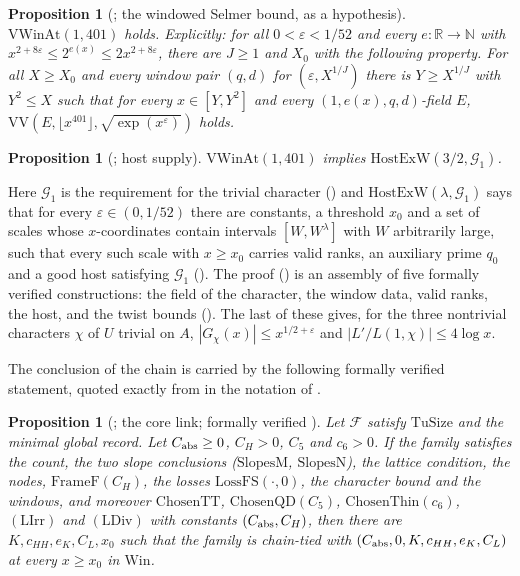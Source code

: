 \documentclass[10pt]{amsart}
\newtheorem{proposition}[theorem]{Proposition}
\theoremstyle{definition}
\theoremstyle{remark}
\newcommand{\R}{\mathbb R}
\newcommand{\N}{\mathbb N}
\begin{document}
\begin{proposition}[{\cite[Proposition~\ref{A-i4:hyp-selmer}]{Annex}}; the windowed Selmer bound, as a hypothesis]\label{inp:prop-hypSel}
$\mathrm{VWinAt}(1,401)$ holds. Explicitly: for all
$0<\varepsilon<1/52$ and every $e:\R\to\N$ with
$x^{2+8\varepsilon}\le2^{e(x)}\le2x^{2+8\varepsilon}$, there are $J\ge1$
and $X_0$ with the following property. For all $X\ge X_0$ and every window
pair $(q,d)$ for $(\varepsilon,X^{1/J})$ there is $Y\ge X^{1/J}$ with
$Y^2\le X$ such that for every $x\in[Y,Y^2]$ and every $(1,e(x),q,d)$-field
$E$, $\mathrm{VV}(E,\lfloor x^{401}\rfloor,\sqrt{\exp(x^\varepsilon)})$
holds.
\end{proposition}

\begin{proposition}[{\cite[Proposition~\ref{A-i4:prop-supply}]{Annex}}; host supply]\label{inp:prop-supply}
$\mathrm{VWinAt}(1,401)$ implies $\mathrm{HostExW}(3/2,\mathcal G_1)$.
\end{proposition}

\noindent Here $\mathcal G_1$ is the requirement for the trivial character
(\cite[Definition~\ref{A-i4:def-G1}]{Annex}) and $\mathrm{HostExW}(\lambda,\mathcal G_1)$
says that for every $\varepsilon\in(0,1/52)$ there are constants, a
threshold $x_0$ and a set of scales whose $x$-coordinates contain intervals
$[W,W^\lambda]$ with $W$ arbitrarily large, such that every such scale with
$x\ge x_0$ carries valid ranks, an auxiliary prime $q_0$ and a good host
satisfying $\mathcal G_1$ (\cite[Definition~\ref{A-i4:def-G1}]{Annex}). The proof (\cite[\S\ref{A-i4:ssec-proof-supply}]{Annex}) is
an assembly of five formally verified constructions: the field of the
character, the window data, valid ranks, the host, and the twist bounds
(\cite[Propositions~\ref{A-i4:Sprop-field}--\ref{A-i4:Sprop-tw}]{Annex}). The
last of these gives, for the three nontrivial characters $\chi$ of $U$
trivial on $A$, $|G_\chi(x)|\le x^{1/2+\varepsilon}$ and
$|L'/L(1,\chi)|\le4\log x$.

The conclusion of the chain is carried by the following formally verified
statement, quoted exactly from \cite[Proposition~\ref{A-i4:Lprop-fam}(c)]{Annex}
in the notation of \cite[\S\ref{A-i4:ssec-links}]{Annex}.

\begin{proposition}[{\cite[Proposition~\ref{A-i4:Lprop-fam}(c)]{Annex}}; the core link; formally verified \cite{CharacterFamily}]\label{inp:prop-corelink}
Let $\mathcal F$ satisfy $\mathrm{TuSize}$ and the minimal global record.
Let $C_{\rm abs}\ge0$, $C_H>0$, $C_5$ and
$c_6>0$. If the family satisfies the count, the two slope conclusions
\textup{(}$\mathrm{SlopesM}$, $\mathrm{SlopesN}$\textup{)}, the lattice condition, the
nodes, $\mathrm{FrameF}(C_H)$, the losses $\mathrm{LossFS}(\cdot,0)$, the
character bound and the windows, and moreover
$\mathrm{ChosenTT}$, $\mathrm{ChosenQD}(C_5)$, $\mathrm{ChosenThin}(c_6)$,
$(\mathrm{LIrr})$ and $(\mathrm{LDiv})$ with constants $(C_{\rm abs},C_H)$,
then there are $K,c_{HH},e_K,C_L,x_0$ such that the family is chain-tied
with $(C_{\rm abs},0,K,c_{HH},e_K,C_L)$ at every $x\ge x_0$ in
$\mathrm{Win}$.
\end{proposition}
\end{document}

